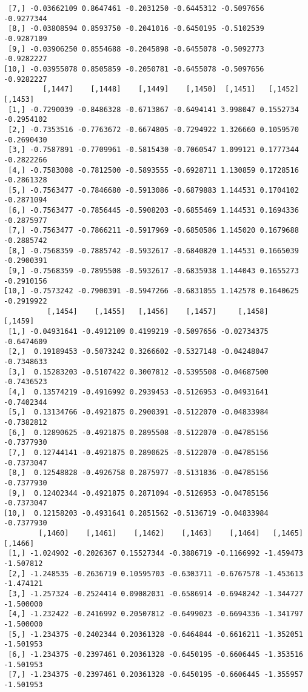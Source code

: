 \documentclass[
  letterpaper,
  DIV=11,
  numbers=noendperiod]{scrreprt}
\begin{document}
\begin{verbatim}
 [7,] -0.03662109 0.8647461 -0.2031250 -0.6445312 -0.5097656 -0.9277344
 [8,] -0.03808594 0.8593750 -0.2041016 -0.6450195 -0.5102539 -0.9287109
 [9,] -0.03906250 0.8554688 -0.2045898 -0.6455078 -0.5092773 -0.9282227
[10,] -0.03955078 0.8505859 -0.2050781 -0.6455078 -0.5097656 -0.9282227
         [,1447]    [,1448]    [,1449]    [,1450]  [,1451]   [,1452]    [,1453]
 [1,] -0.7290039 -0.8486328 -0.6713867 -0.6494141 3.998047 0.1552734 -0.2954102
 [2,] -0.7353516 -0.7763672 -0.6674805 -0.7294922 1.326660 0.1059570 -0.2690430
 [3,] -0.7587891 -0.7709961 -0.5815430 -0.7060547 1.099121 0.1777344 -0.2822266
 [4,] -0.7583008 -0.7812500 -0.5893555 -0.6928711 1.130859 0.1728516 -0.2861328
 [5,] -0.7563477 -0.7846680 -0.5913086 -0.6879883 1.144531 0.1704102 -0.2871094
 [6,] -0.7563477 -0.7856445 -0.5908203 -0.6855469 1.144531 0.1694336 -0.2875977
 [7,] -0.7563477 -0.7866211 -0.5917969 -0.6850586 1.145020 0.1679688 -0.2885742
 [8,] -0.7568359 -0.7885742 -0.5932617 -0.6840820 1.144531 0.1665039 -0.2900391
 [9,] -0.7568359 -0.7895508 -0.5932617 -0.6835938 1.144043 0.1655273 -0.2910156
[10,] -0.7573242 -0.7900391 -0.5947266 -0.6831055 1.142578 0.1640625 -0.2919922
          [,1454]    [,1455]   [,1456]    [,1457]     [,1458]    [,1459]
 [1,] -0.04931641 -0.4912109 0.4199219 -0.5097656 -0.02734375 -0.6474609
 [2,]  0.19189453 -0.5073242 0.3266602 -0.5327148 -0.04248047 -0.7348633
 [3,]  0.15283203 -0.5107422 0.3007812 -0.5395508 -0.04687500 -0.7436523
 [4,]  0.13574219 -0.4916992 0.2939453 -0.5126953 -0.04931641 -0.7402344
 [5,]  0.13134766 -0.4921875 0.2900391 -0.5122070 -0.04833984 -0.7382812
 [6,]  0.12890625 -0.4921875 0.2895508 -0.5122070 -0.04785156 -0.7377930
 [7,]  0.12744141 -0.4921875 0.2890625 -0.5122070 -0.04785156 -0.7373047
 [8,]  0.12548828 -0.4926758 0.2875977 -0.5131836 -0.04785156 -0.7377930
 [9,]  0.12402344 -0.4921875 0.2871094 -0.5126953 -0.04785156 -0.7373047
[10,]  0.12158203 -0.4931641 0.2851562 -0.5136719 -0.04833984 -0.7377930
        [,1460]    [,1461]    [,1462]    [,1463]    [,1464]   [,1465]   [,1466]
 [1,] -1.024902 -0.2026367 0.15527344 -0.3886719 -0.1166992 -1.459473 -1.507812
 [2,] -1.248535 -0.2636719 0.10595703 -0.6303711 -0.6767578 -1.453613 -1.474121
 [3,] -1.257324 -0.2524414 0.09082031 -0.6586914 -0.6948242 -1.344727 -1.500000
 [4,] -1.232422 -0.2416992 0.20507812 -0.6499023 -0.6694336 -1.341797 -1.500000
 [5,] -1.234375 -0.2402344 0.20361328 -0.6464844 -0.6616211 -1.352051 -1.501953
 [6,] -1.234375 -0.2397461 0.20361328 -0.6450195 -0.6606445 -1.353516 -1.501953
 [7,] -1.234375 -0.2397461 0.20361328 -0.6450195 -0.6606445 -1.355957 -1.501953

\end{verbatim}
\end{document}
